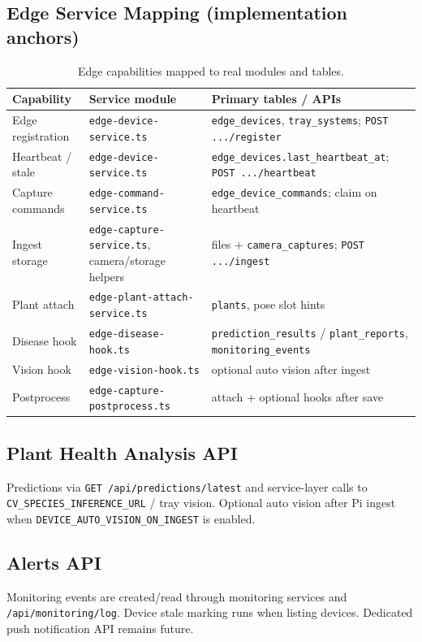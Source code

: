 \documentclass[11pt,letterpaper]{article}
\begin{document}
\subsection{Edge Service Mapping (implementation anchors)}
\begin{table}[H]
\centering
\begin{tabular}{@{}p{3.6cm}p{5.0cm}p{5.0cm}@{}}
\toprule
\textbf{Capability} & \textbf{Service module} & \textbf{Primary tables / APIs} \\
\midrule
Edge registration & \texttt{edge-device-service.ts} & \texttt{edge\_devices},
  \texttt{tray\_systems}; \texttt{POST .../register} \\
Heartbeat / stale & \texttt{edge-device-service.ts} & \texttt{edge\_devices.last\_heartbeat\_at};
  \texttt{POST .../heartbeat} \\
Capture commands & \texttt{edge-command-service.ts} & \texttt{edge\_device\_commands};
  claim on heartbeat \\
Ingest storage & \texttt{edge-capture-service.ts},
  camera/storage helpers & files + \texttt{camera\_captures};
  \texttt{POST .../ingest} \\
Plant attach & \texttt{edge-plant-attach-service.ts} & \texttt{plants}, pose slot hints \\
Disease hook & \texttt{edge-disease-hook.ts} & \texttt{prediction\_results} /
  \texttt{plant\_reports}, \texttt{monitoring\_events} \\
Vision hook & \texttt{edge-vision-hook.ts} & optional auto vision after ingest \\
Postprocess & \texttt{edge-capture-postprocess.ts} & attach + optional hooks after save \\
\bottomrule
\end{tabular}
\caption{Edge capabilities mapped to real modules and tables.}
\label{tab:edge-map}
\end{table}

\subsection{Plant Health Analysis API}
Predictions via \texttt{GET /api/predictions/latest} and service-layer calls to
\texttt{CV\_SPECIES\_INFERENCE\_URL} / tray vision. Optional auto vision after Pi ingest when
\texttt{DEVICE\_AUTO\_VISION\_ON\_INGEST} is enabled.

\subsection{Alerts API}
Monitoring events are created/read through monitoring services and
\texttt{/api/monitoring/log}. Device stale marking runs when listing devices. Dedicated push
notification API remains future.
\end{document}

